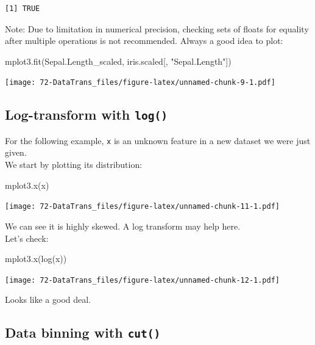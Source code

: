 \documentclass[
]{book}
\newenvironment{Shaded}{\begin{snugshade}}{\end{snugshade}}
\newcommand{\FunctionTok}[1]{\textcolor[rgb]{0.00,0.00,0.00}{#1}}
\newcommand{\NormalTok}[1]{#1}
\newcommand{\StringTok}[1]{\textcolor[rgb]{0.31,0.60,0.02}{#1}}
\begin{document}
\begin{verbatim}
[1] TRUE
\end{verbatim}

Note: Due to limitation in numerical precision, checking sets of floats for equality after multiple operations is not recommended. Always a good idea to plot:

\begin{Shaded}
\begin{Highlighting}[]
\FunctionTok{mplot3.fit}\NormalTok{(Sepal.Length\_scaled, iris.scaled[, }\StringTok{"Sepal.Length"}\NormalTok{])}
\end{Highlighting}
\end{Shaded}

\texttt{[image: 72-DataTrans\_files/figure-latex/unnamed-chunk-9-1.pdf]}

\hypertarget{log-transform-with-log}{%
\subsection{\texorpdfstring{Log-transform with \texttt{log()}}{Log-transform with log()}}\label{log-transform-with-log}}

For the following example, \texttt{x} is an unknown feature in a new dataset we were just given.\\
We start by plotting its distribution:

\begin{Shaded}
\begin{Highlighting}[]
\FunctionTok{mplot3.x}\NormalTok{(x)}
\end{Highlighting}
\end{Shaded}

\texttt{[image: 72-DataTrans\_files/figure-latex/unnamed-chunk-11-1.pdf]}

We can see it is highly skewed. A log transform may help here.\\
Let's check:

\begin{Shaded}
\begin{Highlighting}[]
\FunctionTok{mplot3.x}\NormalTok{(}\FunctionTok{log}\NormalTok{(x))}
\end{Highlighting}
\end{Shaded}

\texttt{[image: 72-DataTrans\_files/figure-latex/unnamed-chunk-12-1.pdf]}

Looks like a good deal.

\hypertarget{data-binning-with-cut}{%
\subsection{\texorpdfstring{Data binning with \texttt{cut()}}{Data binning with cut()}}\label{data-binning-with-cut}}
\end{document}
